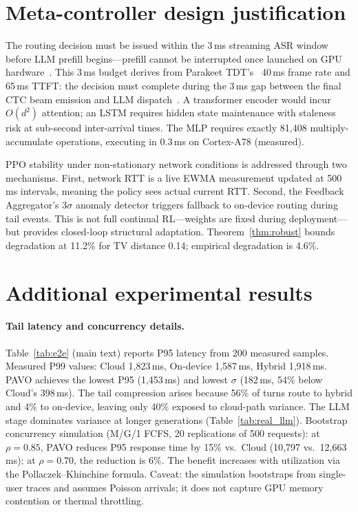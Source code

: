 \documentclass{article}
\begin{document}
\section{Meta-controller design justification}
\label{app:mlp_justification}

The routing decision must be issued within the 3\,ms streaming ASR window before LLM prefill begins---prefill cannot be interrupted once launched on GPU hardware~\citep{yu2022orca,agrawal2024sarathi}. This 3\,ms budget derives from Parakeet TDT's~\citep{parakeet2025,gulati2020conformer} 40\,ms frame rate and 65\,ms TTFT: the decision must complete during the 3\,ms gap between the final CTC beam emission and LLM dispatch~\citep{kwon2023vllm}. A transformer encoder would incur $O(d^2)$ attention; an LSTM requires hidden state maintenance with staleness risk at sub-second inter-arrival times. The MLP requires exactly 81{,}408 multiply-accumulate operations, executing in 0.3\,ms on Cortex-A78 (measured).

PPO stability under non-stationary network conditions is addressed through two mechanisms. First, network RTT is a live EWMA measurement updated at 500\,ms intervals, meaning the policy sees actual current RTT. Second, the Feedback Aggregator's $3\sigma$ anomaly detector triggers fallback to on-device routing during tail events. This is not full continual RL---weights are fixed during deployment---but provides closed-loop structural adaptation. Theorem~\ref{thm:robust} bounds degradation at 11.2\% for TV distance 0.14; empirical degradation is 4.6\%.

\section{Additional experimental results}
\label{app:additional}

\paragraph{Tail latency and concurrency details.}
Table~\ref{tab:e2e} (main text) reports P95 latency from 200 measured samples. Measured P99 values: Cloud 1{,}823\,ms, On-device 1{,}587\,ms, Hybrid 1{,}918\,ms. PAVO achieves the lowest P95 (1{,}453\,ms) and lowest $\sigma$ (182\,ms, 54\% below Cloud's 398\,ms). The tail compression arises because 56\% of turns route to hybrid and 4\% to on-device, leaving only 40\% exposed to cloud-path variance. The LLM stage dominates variance at longer generations (Table~\ref{tab:real_llm}). Bootstrap concurrency simulation (M/G/1 FCFS, 20 replications of 500 requests): at $\rho=0.85$, PAVO reduces P95 response time by 15\% vs.\ Cloud (10{,}797 vs.\ 12{,}663\,ms); at $\rho=0.70$, the reduction is 6\%. The benefit increases with utilization via the Pollaczek--Khinchine formula. Caveat: the simulation bootstraps from single-user traces and assumes Poisson arrivals; it does not capture GPU memory contention or thermal throttling.
\end{document}

